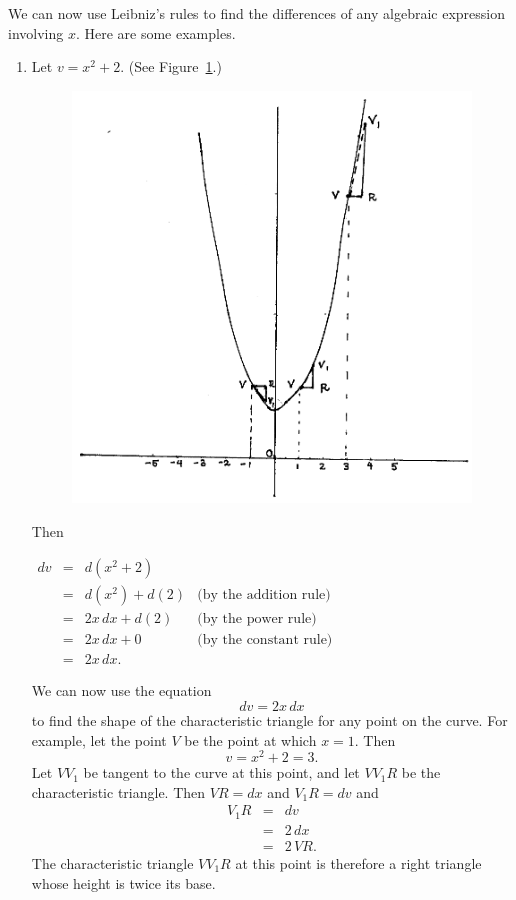 \documentclass[twoside,openright]{article}
\begin{document}
We can now use Leibniz's rules to find the differences of any algebraic expression involving $x$.  Here are some examples.
\begin{enumerate}
\item \label{ex1} Let $v= x^2 + 2.$  (See Figure~\ref{parex}.)
\begin{figure}[htp]
\begin{center}
\includegraphics[width=.85\textwidth]{fig/Figure11}
\caption{}
\label{parex}
\vspace{-10pt}
\end{center}
\end{figure} 
Then
\begin{center}

$\begin{array}{ccll}
dv & = & d(x^2 + 2) & \\
 & = & d(x^2) + d(2) & \mbox{(by the addition rule)}\\
 & = & 2x\,dx + d(2) & \mbox{(by the power rule)}\\
 & = & 2x\,dx + 0 & \mbox{(by the constant rule)}\\
 & = & 2x\,dx. & 
\end{array}$
\end{center}

We can now use the equation
$$dv = 2x\,dx$$
to find the shape of the characteristic triangle for any point on the
curve.  For example, let the point $V$ be the point at which $x = 1$.
Then
$$v = x^2 + 2 = 3.$$
Let $VV_1$ be tangent to the curve at this point, and let $VV_1R$ be
the characteristic triangle.  Then $VR = dx$ and $V_1R = dv$ and
\begin{eqnarray*}
V_1R & =  & dv\\
& = & 2\,dx\\
& = & 2\,VR.
\end{eqnarray*}
The characteristic triangle $VV_1R$ at this point is therefore a right
triangle whose height is twice its base.


\end{enumerate}
\end{document}
